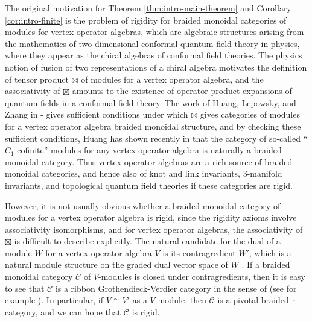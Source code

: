 \documentclass[11pt, reqno]{amsart}
\theoremstyle{definition}\newtheorem{defi}[thm]{Definition}
\theoremstyle{definition}\newtheorem{rem}[thm]{Remark}
\theoremstyle{definition}\newtheorem{exam}[thm]{Example}
\theoremstyle{definition}\newtheorem{assum}[thm]{Assumption}
\newcommand{\cC}{\mathcal{C}}
\begin{document}
The original motivation for Theorem \ref{thm:intro-main-theorem} and Corollary \ref{cor:intro-finite} is the problem of rigidity for braided monoidal categories of modules for vertex operator algebras, which are algebraic structures arising from the mathematics of two-dimensional conformal quantum field theory in physics, where they appear as the chiral algebras of conformal field theories. The physics notion of fusion of two representations of a chiral algebra motivates the definition of tensor product $\boxtimes$ of modules for a vertex operator algebra, and the associativity of $\boxtimes$ amounts to the existence of operator product expansions of quantum fields in a conformal field theory. The work of Huang, Lepowsky, and Zhang in \cite{HLZ1}-\cite{HLZ8} gives sufficient conditions under which $\boxtimes$ gives categories of modules for a vertex operator algebra braided monoidal structure, and by checking these sufficient conditions, Huang has shown recently in \cite{Hu} that the category of so-called ``$C_1$-cofinite'' modules for any vertex operator algebra is naturally a braided monoidal category. Thus vertex operator algebras are a rich source of braided monoidal categories, and hence also of knot and link invariants, $3$-manifold invariants, and topological quantum field theories if these categories are rigid.


However, it is not usually obvious whether a braided monoidal category of modules for a vertex operator algebra is rigid, since the rigidity axioms involve associativity isomorphisms, and for vertex operator algebras, the associativity of $\boxtimes$ is difficult to describe explicitly. The natural candidate for the dual of a module $W$ for a vertex operator algebra $V$ is its contragredient $W'$, which is a natural module structure on the graded dual vector space of $W$ \cite{FHL}. If a braided monoidal category $\cC$ of $V$-modules is closed under contragredients, then it is easy to see that $\cC$ is a ribbon Grothendieck-Verdier category in the sense of \cite{BD} (see for example \cite[Theorem 2.12]{ALSW}). In particular, if $V\cong V'$ as a $V$-module, then $\cC$ is a pivotal braided r-category, and we can hope that $\cC$ is rigid.
\end{document}
